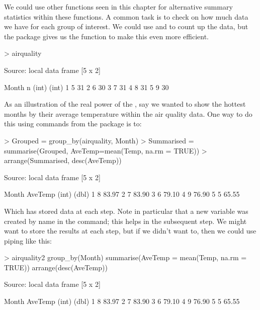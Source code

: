 We could use other functions seen in this chapter for alternative summary statistics within these functions. A common task is to check on how much data we have for each group of interest. We could use  and  to count up the data, but the  package gives us the  function to make this even more efficient. 
\begin{Schunk}
\begin{Sinput}
> airquality%>% count(Month) 
\end{Sinput}
\begin{Soutput}
Source: local data frame [5 x 2]

  Month     n
  (int) (int)
1     5    31
2     6    30
3     7    31
4     8    31
5     9    30
\end{Soutput}
\end{Schunk}
 
 
As an illustration of the real power of the , say we wanted to show the hottest months by their average temperature within the air quality data. One way to do this using commands from the  package is to: 
\begin{Schunk}
\begin{Sinput}
> Grouped = group_by(airquality, Month) 
> Summarised = summarise(Grouped, AveTemp=mean(Temp, na.rm = TRUE)) 
> arrange(Summarised, desc(AveTemp)) 
\end{Sinput}
\begin{Soutput}
Source: local data frame [5 x 2]

  Month AveTemp
  (int)   (dbl)
1     8   83.97
2     7   83.90
3     6   79.10
4     9   76.90
5     5   65.55
\end{Soutput}
\end{Schunk}
Which has stored data at each step. Note in particular that a new variable was created by name in the  command; this helps in the subsequent  step. We might want to store the results at each step, but if we didn't want to, then we could use piping like this: 
\begin{Schunk}
\begin{Sinput}
> airquality2 %>% 
   group_by(Month) %>% 
   summarise(AveTemp = mean(Temp, na.rm = TRUE))  %>% 
   arrange(desc(AveTemp)) 
\end{Sinput}
\begin{Soutput}
Source: local data frame [5 x 2]

  Month AveTemp
  (int)   (dbl)
1     8   83.97
2     7   83.90
3     6   79.10
4     9   76.90
5     5   65.55
\end{Soutput}
\end{Schunk}
 
